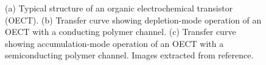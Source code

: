 \begin{figure}[ht]
	\centering
	\qquad
	\caption{(a) Typical structure of an organic electrochemical transistor (OECT). (b) Transfer curve showing depletion-mode operation of an OECT with a conducting polymer channel. (c) Transfer curve showing accumulation-mode operation of an OECT with a semiconducting polymer channel. Images extracted from reference\cite{rivnay_organic_2018}.}
	\label{fig:modes}
\end{figure}


